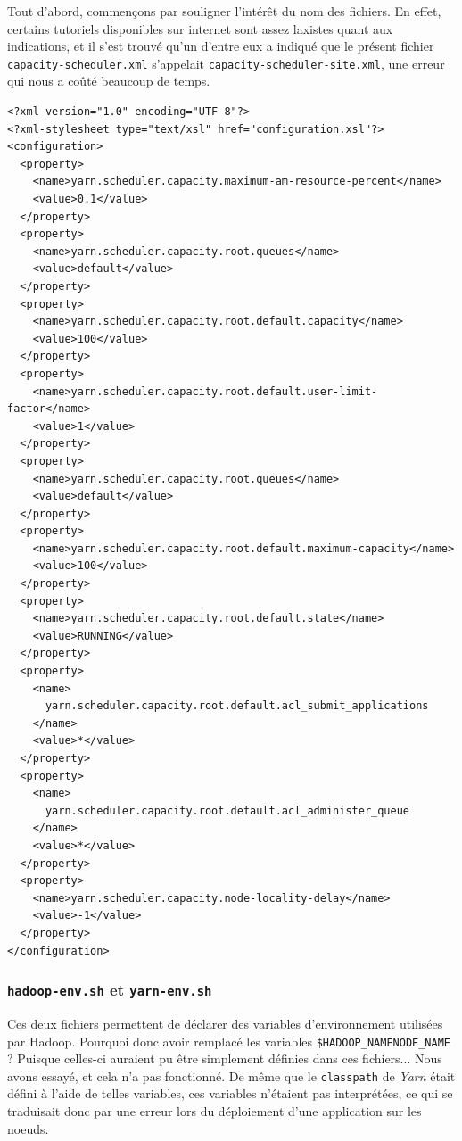 \par Tout d'abord, commençons par souligner l'intérêt du nom des fichiers. En effet, certains tutoriels disponibles sur internet sont assez laxistes quant aux indications, et il s'est trouvé qu'un d'entre eux a indiqué que le présent fichier \texttt{capacity-scheduler.xml} s'appelait \texttt{capacity-scheduler-site.xml}, une erreur qui nous a coûté beaucoup de temps.

\begin{verbatim}
<?xml version="1.0" encoding="UTF-8"?>
<?xml-stylesheet type="text/xsl" href="configuration.xsl"?>
<configuration>
  <property>
    <name>yarn.scheduler.capacity.maximum-am-resource-percent</name>
    <value>0.1</value>
  </property>
  <property>
    <name>yarn.scheduler.capacity.root.queues</name>
    <value>default</value>
  </property>
  <property>
    <name>yarn.scheduler.capacity.root.default.capacity</name>
    <value>100</value>
  </property>
  <property>
    <name>yarn.scheduler.capacity.root.default.user-limit-factor</name>
    <value>1</value>
  </property>
  <property>
    <name>yarn.scheduler.capacity.root.queues</name>
    <value>default</value>
  </property>
  <property>
    <name>yarn.scheduler.capacity.root.default.maximum-capacity</name>
    <value>100</value>
  </property>
  <property>
    <name>yarn.scheduler.capacity.root.default.state</name>
    <value>RUNNING</value>
  </property>
  <property>
    <name>
      yarn.scheduler.capacity.root.default.acl_submit_applications
    </name>
    <value>*</value>
  </property>
  <property>
    <name>
      yarn.scheduler.capacity.root.default.acl_administer_queue
    </name>
    <value>*</value>
  </property>
  <property>
    <name>yarn.scheduler.capacity.node-locality-delay</name>
    <value>-1</value>
  </property>
</configuration>
\end{verbatim}

\subsubsection{\texttt{hadoop-env.sh} et \texttt{yarn-env.sh}}
\label{sec:hadoop-env.sh-et}

\par Ces deux fichiers permettent de déclarer des variables d'environnement utilisées par Hadoop. Pourquoi donc avoir remplacé les variables \texttt{\$HADOOP\_NAMENODE\_NAME} ? Puisque celles-ci auraient pu être simplement définies dans ces fichiers... Nous avons essayé, et cela n'a pas fonctionné. De même que le \texttt{classpath} de \emph{Yarn} était défini à l'aide de telles variables, ces variables n'étaient pas interprétées, ce qui se traduisait donc par une erreur lors du déploiement d'une application sur les noeuds.

